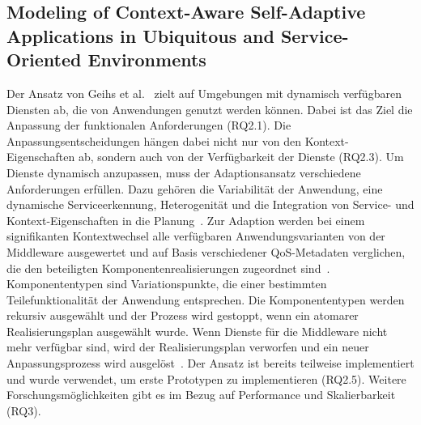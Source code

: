 \documentclass[conference,compsoc]{IEEEtran}
\begin{document}
\subsection{Modeling of Context-Aware Self-Adaptive Applications in Ubiquitous and Service-Oriented Environments}
Der Ansatz von Geihs et al.~\cite{geihs2009modeling} zielt auf Umgebungen mit dynamisch verfügbaren Diensten ab, die von Anwendungen genutzt werden können. Dabei ist das Ziel die Anpassung der funktionalen Anforderungen (RQ2.1). Die Anpassungsentscheidungen hängen dabei nicht nur von den Kontext-Eigenschaften ab, sondern auch von der Verfügbarkeit der Dienste (RQ2.3). Um Dienste dynamisch anzupassen, muss der Adaptionsansatz verschiedene Anforderungen erfüllen. Dazu gehören die Variabilität der Anwendung, eine dynamische Serviceerkennung, Heterogenität und die Integration von Service- und Kontext-Eigenschaften in die Planung~\cite{geihs2009modeling}.
Zur Adaption werden bei einem signifikanten Kontextwechsel alle verfügbaren Anwendungsvarianten von der Middleware ausgewertet und auf Basis verschiedener QoS-Metadaten verglichen, die den beteiligten Komponentenrealisierungen zugeordnet sind~\cite{geihs2009modeling}. Komponententypen sind Variationspunkte, die einer bestimmten Teilefunktionalität der Anwendung entsprechen. Die Komponententypen werden rekursiv ausgewählt und der Prozess wird gestoppt, wenn ein atomarer Realisierungsplan ausgewählt wurde.
Wenn Dienste für die Middleware nicht mehr verfügbar sind, wird der Realisierungsplan verworfen und ein neuer Anpassungsprozess wird ausgelöst~\cite{geihs2009modeling}.
Der Ansatz ist bereits teilweise implementiert und wurde verwendet, um erste Prototypen zu implementieren (RQ2.5). Weitere Forschungsmöglichkeiten gibt es im Bezug auf Performance und Skalierbarkeit (RQ3).
\end{document}
